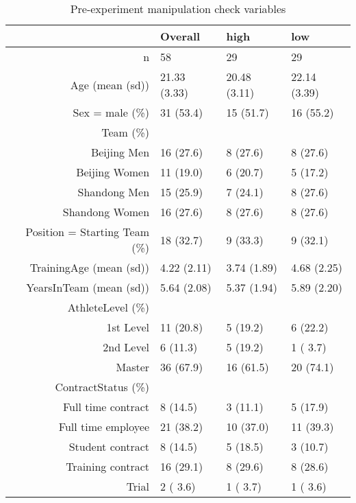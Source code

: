 \begin{table}[ht]
\centering
\begin{tabular}{rlll}
  \hline
 & Overall & high & low \\ 
  \hline
n &    58 &    29 &    29 \\ 
  Age (mean (sd)) & 21.33 (3.33) & 20.48 (3.11) & 22.14 (3.39) \\ 
  Sex = male (\%) &    31 (53.4)  &    15 (51.7)  &    16 (55.2)  \\ 
  Team (\%) &     &     &     \\ 
     Beijing Men &    16 (27.6)  &     8 (27.6)  &     8 (27.6)  \\ 
     Beijing Women &    11 (19.0)  &     6 (20.7)  &     5 (17.2)  \\ 
     Shandong Men &    15 (25.9)  &     7 (24.1)  &     8 (27.6)  \\ 
     Shandong Women &    16 (27.6)  &     8 (27.6)  &     8 (27.6)  \\ 
  Position = Starting Team (\%) &    18 (32.7)  &     9 (33.3)  &     9 (32.1)  \\ 
  TrainingAge (mean (sd)) &  4.22 (2.11) &  3.74 (1.89) &  4.68 (2.25) \\ 
  YearsInTeam (mean (sd)) &  5.64 (2.08) &  5.37 (1.94) &  5.89 (2.20) \\ 
  AthleteLevel (\%) &     &     &     \\ 
     1st Level &    11 (20.8)  &     5 (19.2)  &     6 (22.2)  \\ 
     2nd Level &     6 (11.3)  &     5 (19.2)  &     1 ( 3.7)  \\ 
     Master &    36 (67.9)  &    16 (61.5)  &    20 (74.1)  \\ 
  ContractStatus (\%) &     &     &     \\ 
     Full time contract &     8 (14.5)  &     3 (11.1)  &     5 (17.9)  \\ 
     Full time employee &    21 (38.2)  &    10 (37.0)  &    11 (39.3)  \\ 
     Student contract &     8 (14.5)  &     5 (18.5)  &     3 (10.7)  \\ 
     Training contract &    16 (29.1)  &     8 (29.6)  &     8 (28.6)  \\ 
     Trial &     2 ( 3.6)  &     1 ( 3.7)  &     1 ( 3.6)  \\ 
   \hline
\end{tabular}
\caption{Pre-experiment manipulation check variables} 
\label{tab:manipulationCheckTable}
\end{table}
